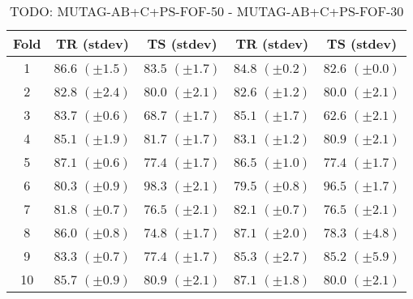 \documentclass[10pt,a4paper]{book}
\begin{document}
\begin{table}[tbph]
\caption{TODO: MUTAG-AB+C+PS-FOF-50 - MUTAG-AB+C+PS-FOF-30}
\label{TODO}
\centering
\begin{tabular}{c*{4}{c}}
\toprule
Fold & TR (stdev) & TS (stdev) & TR (stdev) & TS (stdev)\\
\midrule
1 & $86.6$ $(\pm 1.5)$ & $83.5$ $(\pm 1.7)$ & $84.8$ $(\pm 0.2)$ & $82.6$ $(\pm 0.0)$\\
2 & $82.8$ $(\pm 2.4)$ & $80.0$ $(\pm 2.1)$ & $82.6$ $(\pm 1.2)$ & $80.0$ $(\pm 2.1)$\\
3 & $83.7$ $(\pm 0.6)$ & $68.7$ $(\pm 1.7)$ & $85.1$ $(\pm 1.7)$ & $62.6$ $(\pm 2.1)$\\
4 & $85.1$ $(\pm 1.9)$ & $81.7$ $(\pm 1.7)$ & $83.1$ $(\pm 1.2)$ & $80.9$ $(\pm 2.1)$\\
5 & $87.1$ $(\pm 0.6)$ & $77.4$ $(\pm 1.7)$ & $86.5$ $(\pm 1.0)$ & $77.4$ $(\pm 1.7)$\\
6 & $80.3$ $(\pm 0.9)$ & $98.3$ $(\pm 2.1)$ & $79.5$ $(\pm 0.8)$ & $96.5$ $(\pm 1.7)$\\
7 & $81.8$ $(\pm 0.7)$ & $76.5$ $(\pm 2.1)$ & $82.1$ $(\pm 0.7)$ & $76.5$ $(\pm 2.1)$\\
8 & $86.0$ $(\pm 0.8)$ & $74.8$ $(\pm 1.7)$ & $87.1$ $(\pm 2.0)$ & $78.3$ $(\pm 4.8)$\\
9 & $83.3$ $(\pm 0.7)$ & $77.4$ $(\pm 1.7)$ & $85.3$ $(\pm 2.7)$ & $85.2$ $(\pm 5.9)$\\
10 & $85.7$ $(\pm 0.9)$ & $80.9$ $(\pm 2.1)$ & $87.1$ $(\pm 1.8)$ & $80.0$ $(\pm 2.1)$\\
\bottomrule
\end{tabular}
\end{table}


\end{document}
